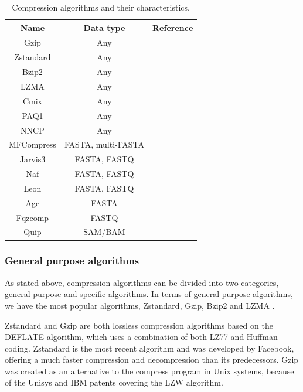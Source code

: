 \begin{table}
\caption{Compression algorithms and their characteristics.}
\label{table:compression_algorithms}
\begin{center}
    \begin{tabular}{|| c | c | c ||}
        \hline
        Name & Data type & Reference \\
        \hline
        Gzip        & Any & \citet{rfc1952}\\ \hline
        Zstandard   & Any & \citet{rfc8878}\\ \hline
        Bzip2       & Any & \citet{bzip2}\\ \hline
        LZMA        & Any & \citet{lzma}\\ \hline
        Cmix        & Any & \citet{cmix}\\ \hline
        PAQ1        & Any & \citet{Mahoney2002}\\ \hline
        NNCP        & Any & \citet{NNCP}\\ \hline
        MFCompress  & FASTA, multi-FASTA & \citet{Pinho2014}\\ \hline
        Jarvis3     & FASTA, FASTQ & \citet{jarvis3}\\ \hline
        Naf         & FASTA, FASTQ & \citet{Kryukov2019}\\ \hline
        Leon        & FASTA, FASTQ & \citet{Benoit2015}\\ \hline
        Agc         & FASTA & \citet{Deorowicz2023}\\ \hline
        Fqzcomp     & FASTQ & \citet{fqzcomp}\\ \hline
        Quip        & SAM/BAM & \citet{Jones2012}\\ \hline
    \end{tabular}
\end{center}
\end{table}

\subsubsection{General purpose algorithms}

As stated above, compression algorithms can be divided into two categories, general purpose and specific algorithms. In terms of general purpose algorithms, we have the most popular algorithms, Zstandard, Gzip, Bzip2 and LZMA \cite{GeekyHumans}.

Zstandard and Gzip are both lossless compression algorithms based on the DEFLATE algorithm, which uses a combination of both LZ77 and Huffman coding. Zstandard is the most recent algorithm and was developed by Facebook, offering a much faster compression and decompression than its predecessors. Gzip was created as an alternative to the compress program in Unix systems, because of the Unisys and IBM patents covering the LZW algorithm.

